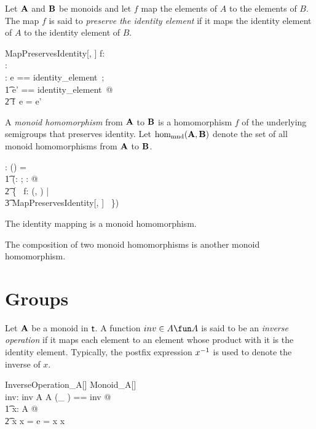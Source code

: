 \documentclass{amsart}
\begin{document}
Let $\mathbf{A}$ and $\mathbf{B}$ be monoids and let $f$ map the elements of $A$ to the elements of $B$.
The map $f$ is said to {\em preserve the identity element} if it maps the identity element of $A$
to the identity element of $B$.
\begin{schema}{MapPreservesIdentity}[\genT, \genU]
	f: \genT \pfun \genU \\
	\strucA: \monoid \genT \\
	\strucB: \monoid \genU
\where
\LET e == identity\_element~\strucA; \\
\t1	e' == identity\_element~\strucB @ \\
\t2		f~e = e'
\end{schema}

A {\em monoid homomorphism} from $\mathbf{A}$ to $\mathbf{B}$ is a homomorphism $f$ of the underlying semigroups
that preserves identity.
Let $\operatorname{hom_{mnd}}(\mathbf{A}, \mathbf{B})$ denote the set of all monoid homomorphisms from $\mathbf{A}$ to $\mathbf{B}$.
\begin{gendef}[\genT, \genU]
	\homMonoid: \monoid \genT \cross \monoid \genU \fun \power (\genT \fun \genU)
\where
	\homMonoid = \\
	\t1	(\lambda \strucA: \monoid \genT; \strucB: \monoid \genU @ \\
	\t2		\{~ f: \homSemigroup(\strucA, \strucB) | \\
	\t3			MapPreservesIdentity[\genT, \genU] ~\})
\end{gendef}

\begin{remark}
The identity mapping is a monoid homomorphism.
\end{remark}

\begin{remark}
The composition of two monoid homomorphisms is another monoid homomorphism.
\end{remark}

\section{Groups}

Let $\mathbf{A}$ be a monoid in $\mathsf{t}$.
A function $inv \in A \fun A$ is said to be an \textit{inverse operation} if it maps each element
to an element whose product with it is the identity element.
Typically, the postfix expression $x ^{-1}$ is used to denote the inverse of $x$.

\begin{schema}{InverseOperation\_A}[\genT]
	Monoid\_A[\genT] \\
	inv: \genT \pfun \genT
\where
	inv \in A \fun A
\also
	\LET (\_ \invG) == inv @ \\
	\t1	\forall x: A @ \\
	\t2		x \mulA x \invG = e = x \invG  \mulA x
\end{schema}
\end{document}
